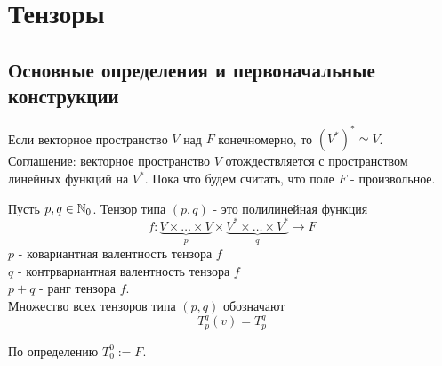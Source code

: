 \section{Тензоры}
\subsection{Основные определения и первоначальные конструкции}
Если векторное пространство $V$ над $F$ конечномерно, то $(V^*)^*\simeq V$. \\
Соглашение: векторное пространство $V$ отождествляется с пространством линейных функций на $V^*$.
Пока что будем считать, что поле $F$ - произвольное.
\begin{definition}
    Пусть $p,q\in \mathbb{N}_0$. Тензор типа $(p,q)$ - это полилинейная функция 
    \[f: \underbrace{V\times \dots\times V}_p \times \underbrace{V^*\times \dots\times V^*}_q \to F\]
    $p$ - ковариантная валентность тензора $f$\\
    $q$ - контрвариантная валентность тензора $f$ \\
    $p+q$ - ранг тензора $f$. \\
    Множество всех тензоров типа $(p,q)$ обозначают 
    \[T^q_p(v)=T^q_p\]
\end{definition} 
По определению $T_0^0 := F$.
